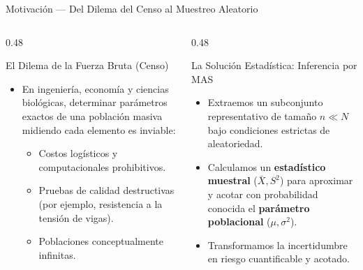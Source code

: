 \documentclass[10pt, aspectratio=169]{beamer}
\begin{document}
\begin{frame}{Motivación --- Del Dilema del Censo al Muestreo Aleatorio}
  \begin{columns}[T]
    \begin{column}{0.48\textwidth}
      \begin{block}{El Dilema de la Fuerza Bruta (Censo)}
        \small
        \begin{itemize}\itemsep=0.1cm
          \item En ingeniería, economía y ciencias biológicas, determinar parámetros exactos de una población masiva midiendo cada elemento es inviable:
          \begin{itemize}
            \item Costos logísticos y computacionales prohibitivos.
            \item Pruebas de calidad destructivas (por ejemplo, resistencia a la tensión de vigas).
            \item Poblaciones conceptualmente infinitas.
          \end{itemize}
        \end{itemize}
      \end{block}
    \end{column}
    \begin{column}{0.48\textwidth}
      \begin{alertblock}{La Solución Estadística: Inferencia por MAS}
        \small
        \begin{itemize}\itemsep=0.1cm
          \item Extraemos un subconjunto representativo de tamaño $n \ll N$ bajo condiciones estrictas de aleatoriedad.
          \item Calculamos un \textbf{estadístico muestral} ($\bar{X}, S^2$) para aproximar y acotar con probabilidad conocida el \textbf{parámetro poblacional} ($\mu, \sigma^2$).
          \item Transformamos la incertidumbre en riesgo cuantificable y acotado.
        \end{itemize}
      \end{alertblock}
    \end{column}
  \end{columns}
\end{frame}
\end{document}
